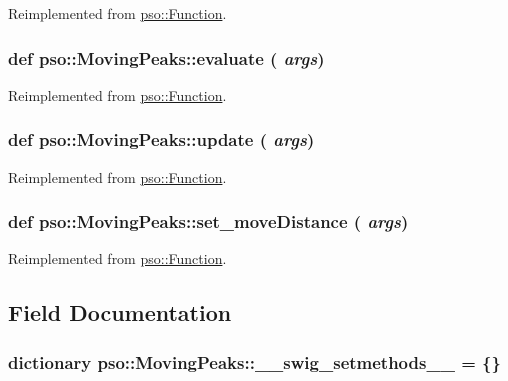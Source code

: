 Reimplemented from \hyperlink{classpso_1_1Function_c80bd40fcf4a956e5732ed099bccc598}{pso::Function}.\hypertarget{classpso_1_1MovingPeaks_bac0595181eff4c3e7b1975e58c7af22}{
\subsubsection{\setlength{\rightskip}{0pt plus 5cm}def pso::MovingPeaks::evaluate ( {\em args})}}
\label{classpso_1_1MovingPeaks_bac0595181eff4c3e7b1975e58c7af22}




Reimplemented from \hyperlink{classpso_1_1Function_7c958ea6d942a89ae219b872b4d73541}{pso::Function}.\hypertarget{classpso_1_1MovingPeaks_2498bfb3e35cc34ed63f1fcf6c8dbdd6}{
\subsubsection{\setlength{\rightskip}{0pt plus 5cm}def pso::MovingPeaks::update ( {\em args})}}
\label{classpso_1_1MovingPeaks_2498bfb3e35cc34ed63f1fcf6c8dbdd6}




Reimplemented from \hyperlink{classpso_1_1Function_95ef0ee896d9855495cb2518c368fecf}{pso::Function}.\hypertarget{classpso_1_1MovingPeaks_5ade0db216cabe9a9eb062e7dcc59ec2}{
\subsubsection{\setlength{\rightskip}{0pt plus 5cm}def pso::MovingPeaks::set\_\-moveDistance ( {\em args})}}
\label{classpso_1_1MovingPeaks_5ade0db216cabe9a9eb062e7dcc59ec2}




Reimplemented from \hyperlink{classpso_1_1Function_2376cbe3a5701668c87049794b47b0db}{pso::Function}.

\subsection{Field Documentation}
\hypertarget{classpso_1_1MovingPeaks_635671a6ae57a2c5d14d2ab1627f2f2c}{
\subsubsection{\setlength{\rightskip}{0pt plus 5cm}dictionary {\bf pso::MovingPeaks::\_\-\_\-swig\_\-setmethods\_\-\_\-} = \{\}}}
\label{classpso_1_1MovingPeaks_635671a6ae57a2c5d14d2ab1627f2f2c}




